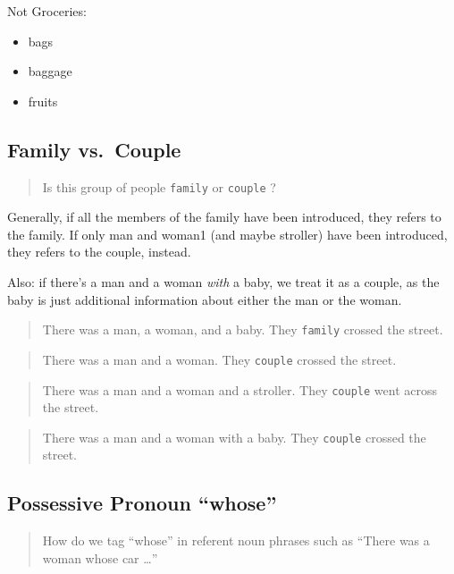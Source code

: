 \documentclass[
]{book}
\providecommand{\tightlist}{%
  \setlength{\itemsep}{0pt}\setlength{\parskip}{0pt}}
\begin{document}
Not Groceries:

\begin{itemize}
\tightlist
\item
  bags
\item
  baggage
\item
  fruits
\end{itemize}

\hypertarget{family-vs.-couple}{%
\subsection{Family vs.~Couple}\label{family-vs.-couple}}

\begin{quote}
Is this group of people \texttt{family} or \texttt{couple} ?
\end{quote}

Generally, if all the members of the family have been introduced, they refers to the family.
If only man and woman1 (and maybe stroller) have been introduced, they refers to the couple, instead.

Also: if there's a man and a woman \emph{with} a baby, we treat it as a couple, as the baby is just additional information about either the man or the woman.

\begin{quote}
There was a man, a woman, and a baby.
They \texttt{family} crossed the street.
\end{quote}

\begin{quote}
There was a man and a woman.
They \texttt{couple} crossed the street.
\end{quote}

\begin{quote}
There was a man and a woman and a stroller.
They \texttt{couple} went across the street.
\end{quote}

\begin{quote}
There was a man and a woman with a baby.
They \texttt{couple} crossed the street.
\end{quote}

\hypertarget{possessive-pronoun-whose}{%
\subsection{Possessive Pronoun ``whose''}\label{possessive-pronoun-whose}}

\begin{quote}
How do we tag ``whose'' in referent noun phrases such as ``There was a woman whose car \ldots{}''
\end{quote}
\end{document}
